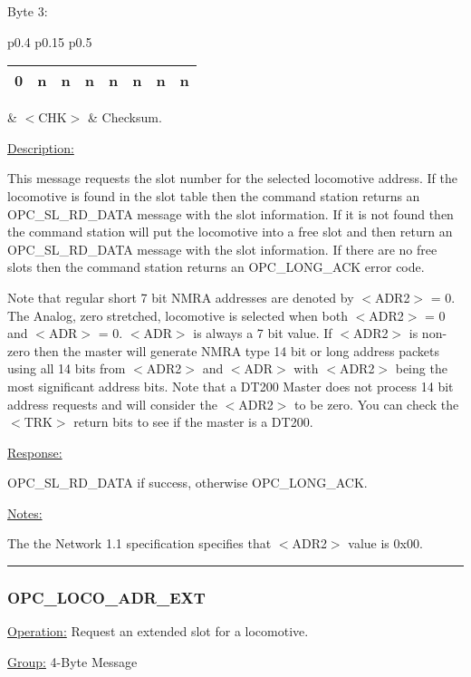 Byte 3:

\begin{tabular}{p{0.4\linewidth} p{0.15\linewidth} p{0.5\linewidth}} 

\begin{tabular}{|p{0.3cm}|p{0.3cm}|p{0.3cm}|p{0.3cm}|p{0.3cm}|p{0.3cm}|p{0.3cm}|p{0.3cm}|}
\hline
0 & n & n & n & n & n & n & n\\
\hline
\end{tabular}
& $<$CHK$>$ & Checksum.

\end{tabular}

\underline{Description:}

This message requests the slot number for the selected locomotive address. If the locomotive is found in the slot table then the command station returns an OPC\_SL\_RD\_DATA message with the slot information. If it is not found then the command station will put the locomotive into a free slot and then return an OPC\_SL\_RD\_DATA message with the slot information. If there are no free slots then the command station returns an OPC\_LONG\_ACK error code.

Note that regular short 7 bit NMRA addresses are denoted by $<$ADR2$>$ = 0. The Analog, zero stretched, locomotive is selected when both $<$ADR2$>$ = 0 and $<$ADR$>$ = 0. $<$ADR$>$ is always a 7 bit value. If $<$ADR2$>$ is non-zero then the master will generate NMRA type 14 bit or long address packets using all 14 bits from $<$ADR2$>$ and $<$ADR$>$ with $<$ADR2$>$ being the most significant address bits. Note that a DT200 Master does not process 14 bit address requests and will consider the $<$ADR2$>$ to be zero. You can check the $<$TRK$>$ return bits to see if the master is a DT200.

\underline{Response:} 

OPC\_SL\_RD\_DATA if success, otherwise OPC\_LONG\_ACK.

\underline{Notes:} 

The the Network 1.1 specification specifies that $<$ADR2$>$ value is 0x00.

\rule{15.1cm}{0.4pt}
\subsubsection{OPC\_LOCO\_ADR\_EXT}
\underline{Operation:} Request an extended slot for a locomotive.

\underline{Group:} \hspace{0.5cm} 4-Byte Message

